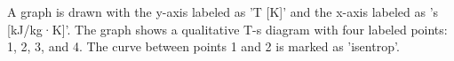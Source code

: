 A graph is drawn with the y-axis labeled as 'T [K]' and the x-axis labeled as 's [kJ/kg·K]'. The graph shows a qualitative T-s diagram with four labeled points: 1, 2, 3, and 4. The curve between points 1 and 2 is marked as 'isentrop'.